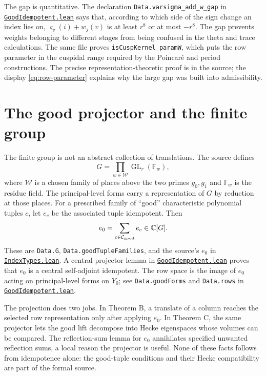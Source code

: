 \documentclass[11pt,oneside,openany]{amsbook}
\theoremstyle{remark}
\numberwithin{equation}{section}
\newcommand{\C}{\mathbb C}
\newcommand{\ghroot}{https://github.com/lsernau/grh-lean/blob/}
\newcommand{\ghrev}{72fead102f663d5c7a407964a13dc0cf9d977207}
\newcommand{\leanfile}[2]{%
  \href{\ghroot\ghrev/grh-compact/src/#1}{\nolinkurl{#2}}}
\begin{document}
The gap is quantitative. The declaration
\texttt{Data.varsigma\_add\_w\_gap} in
\leanfile{New/Trace/GoodIdempotent.lean}%
{GoodIdempotent.lean} says that, according to which
side of the sign change an index lies on,
$\varsigma_v(i)+w_j(v)$ is at least $r^8$ or at most
$-r^8$. The gap prevents weights belonging to
different stages from being confused in the theta
and trace calculations. The same file proves
\texttt{isCuspKernel\_paramW}, which puts the
row parameter in the cuspidal range required by the
Poincar\'e and period constructions. The precise
representation-theoretic proof is in the source; the
display \eqref{eq:row-parameter} explains why the
large gap was built into admissibility.

\section{The good projector and the finite group}
\label{sec:good-projector}
The finite group is not an abstract collection of
translations. The source defines
\begin{equation}
\label{eq:finite-group}
G=\prod_{w\in\mathcal W}
\operatorname{GL}_{r}(\mathbb F_w),
\end{equation}
where $\mathcal W$ is a chosen family of places above
the two primes $g_0,g_1$ and $\mathbb F_w$ is the
residue field. The principal-level forms carry a
representation of $G$ by reduction at those places.
For a prescribed family of ``good'' characteristic
polynomial tuples $c$, let $e_c$ be the associated
tuple idempotent. Then
\begin{equation}
\label{eq:good-idempotent}
e_0=\sum_{c\in\mathcal C_{\rm good}}e_c\in\C[G].
\end{equation}
These are \texttt{Data.G},
\texttt{Data.goodTupleFamilies}, and the source's $e_0$
in \leanfile{New/Seesaw/IndexTypes.lean}%
{IndexTypes.lean}. A central-projector lemma in
\leanfile{New/Trace/GoodIdempotent.lean}%
{GoodIdempotent.lean} proves that $e_0$ is a central
self-adjoint idempotent. The row space is
the image of $e_0$ acting on principal-level forms on
$Y_0$; see \texttt{Data.goodForms} and
\texttt{Data.rows} in
\leanfile{New/Trace/GoodIdempotent.lean}%
{GoodIdempotent.lean}.

The projection does two jobs. In Theorem B, a translate
of a column reaches the selected row representation
only after applying $e_0$. In Theorem C, the same
projector lets the good lift decompose into Hecke
eigenspaces whose volumes can be compared. The
reflection-sum lemma for $e_0$ annihilates
specified unwanted reflection sums, a local reason the
projector is useful. None of these facts follows from
idempotence alone: the good-tuple conditions and their
Hecke compatibility are part of the formal source.
\end{document}
